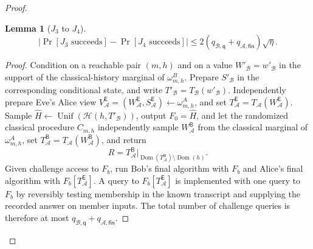 \documentclass[11pt]{article}
\newcounter{algorithm}
\newtheorem{lemma}[lemma]{Lemma}
\newcommand{\cA}{\mathcal{A}}
\newcommand{\cB}{\mathcal{B}}
\newcommand{\cH}{\mathcal{H}}
\newcommand{\Dom}{\operatorname{Dom}}
\newcommand{\Unif}{\operatorname{Unif}}
\begin{document}
\begin{proof}
\begin{lemma}[\(J_3\) to \(J_4\)]
\label{lem:multi-j3-j4}
\[
  \left|
    \Pr[J_3\text{ succeeds}]-\Pr[J_4\text{ succeeds}]
  \right|
  \le
  2(q_{\cB,\mathsf q}+q_{\cA,\mathsf{fin}})\sqrt\eta.
\]
\end{lemma}

\begin{proof}
Condition on a reachable pair \((m,h)\) and on a value
\(W'_{\cB}=w'_{\cB}\) in the support of the classical-history marginal of
\(\omega^B_{m,h}\). Prepare \(S'_{\cB}\) in the corresponding conditional
state, and write \(T'_{\cB}=T_{\cB}(w'_{\cB})\). Independently prepare Eve's Alice view
\(V^{\mathsf E}_{\cA}=(W^{\mathsf E}_{\cA},S^{\mathsf E}_{\cA})
\leftarrow\omega^A_{m,h}\), and set
\(T^{\mathsf E}_{\cA}=T_{\cA}(W^{\mathsf E}_{\cA})\).  Sample
\(\widehat H\leftarrow\Unif(\cH(h,T'_{\cB}))\), output
\(F_0=\widehat H\), and let the randomized classical procedure
\(C_{m,h}\) independently sample \(W^{\mathsf B}_{\cA}\) from the classical
marginal of \(\omega^A_{m,h}\), set
\(T^{\mathsf B}_{\cA}=T_{\cA}(W^{\mathsf B}_{\cA})\), and return
\[
  R
  =
  T^{\mathsf B}_{\cA}
  \big|_{\Dom(T^{\mathsf B}_{\cA})\setminus\Dom(h)}.
\]
Given challenge access to \(F_b\), run Bob's final algorithm with \(F_b\)
and Alice's final algorithm with \(F_b[T^{\mathsf E}_{\cA}]\).  A query to
\(F_b[T^{\mathsf E}_{\cA}]\) is implemented with one query to \(F_b\) by
reversibly testing membership in the known transcript and supplying the
recorded answer on member inputs. The total number of challenge queries is
therefore at most
\(q_{\cB,\mathsf q}+q_{\cA,\mathsf{fin}}\).


\end{proof}
\end{proof}
\end{document}
